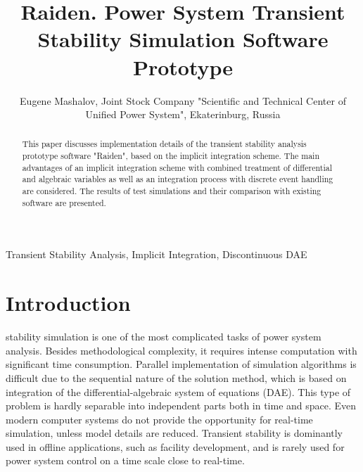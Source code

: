 \documentclass[lettersize,journal]{IEEEtran}
\begin{document}
	

\title{Raiden. Power System Transient Stability Simulation Software Prototype}

\author {Eugene Mashalov, Joint Stock Company "Scientific and Technical Center of Unified Power System", Ekaterinburg, Russia}




\maketitle

\begin{abstract}
This paper discusses implementation details of the transient stability analysis prototype software "Raiden", based on the implicit integration scheme. The main advantages of an implicit integration scheme with combined treatment of differential and algebraic variables as well as an integration process with discrete event handling are considered. The results of test simulations and their comparison with existing software are presented.
\end{abstract}

\begin{IEEEkeywords}
Transient Stability Analysis, Implicit Integration, Discontinuous DAE
\end{IEEEkeywords}

\section{Introduction}
 stability simulation is one of the most complicated tasks of power system analysis. Besides methodological complexity, it requires intense computation with significant time consumption. Parallel implementation of simulation algorithms is difficult due to the sequential nature of the solution method, which is based on integration of the differential-algebraic system of equations (DAE). This type of problem is hardly separable into independent parts both in time and space. Even modern computer systems do not provide the opportunity for real-time simulation, unless model details are reduced. Transient stability is dominantly used in offline applications, such as facility development, and is rarely used for power system control on a time scale close to real-time.
\end{document}
